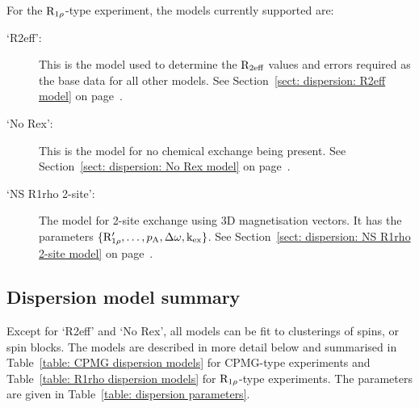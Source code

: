 For the $\mathrm{R}_{1\rho}$-type experiment, the models currently supported are:

\begin{description}
\item[`R2eff':]  This is the model used to determine the $\mathrm{R}_{2\textrm{eff}}$ values and errors required as the base data for all other models.  See Section~\ref{sect: dispersion: R2eff model} on page~\pageref{sect: dispersion: R2eff model}.
\item[`No Rex':]  This is the model for no chemical exchange being present.  See Section~\ref{sect: dispersion: No Rex model} on page~\pageref{sect: dispersion: No Rex model}.
\item[`NS R1rho 2-site':]  The model for 2-site exchange using 3D magnetisation vectors.  It has the parameters $\{\mathrm{R}_{1\rho}', \dots, p_\textrm{A}, \Delta\omega, \textrm{k}_\textrm{ex}\}$.  See Section~\ref{sect: dispersion: NS R1rho 2-site model} on page~\pageref{sect: dispersion: NS R1rho 2-site model}.
\end{description}






\subsection{Dispersion model summary}

Except for `R2eff' and `No Rex', all models can be fit to clusterings of spins, or spin blocks.
The models are described in more detail below and summarised in Table~\ref{table: CPMG dispersion models} for CPMG-type experiments and Table~\ref{table: R1rho dispersion models} for $\mathrm{R}_{1\rho}$-type experiments.
The parameters are given in Table~\ref{table: dispersion parameters}.


